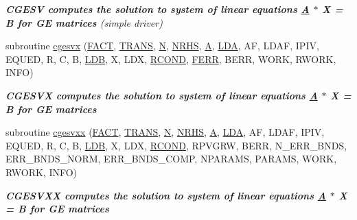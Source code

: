 \begin{DoxyCompactItemize}
\begin{DoxyCompactList}\small\item\em {\bfseries  C\+G\+E\+S\+V computes the solution to system of linear equations \hyperlink{classA}{A} $\ast$ X = B for G\+E matrices} (simple driver) \end{DoxyCompactList}\item 
subroutine \hyperlink{group__complexGEsolve_ga7ee0854ace0491ca1278df6d7a0eb28d}{cgesvx} (\hyperlink{superlu__enum__consts_8h_af00a42ecad444bbda75cde1b64bd7e72a1b6692b56d378abb85bd49063721d034}{F\+A\+C\+T}, \hyperlink{superlu__enum__consts_8h_a0c4e17b2d5cea33f9991ccc6a6678d62a1f61e3015bfe0f0c2c3fda4c5a0cdf58}{T\+R\+A\+N\+S}, \hyperlink{polmisc_8c_a0240ac851181b84ac374872dc5434ee4}{N}, \hyperlink{example__user_8c_aa0138da002ce2a90360df2f521eb3198}{N\+R\+H\+S}, \hyperlink{classA}{A}, \hyperlink{example__user_8c_ae946da542ce0db94dced19b2ecefd1aa}{L\+D\+A}, A\+F, L\+D\+A\+F, I\+P\+I\+V, E\+Q\+U\+E\+D, R, C, B, \hyperlink{example__user_8c_a50e90a7104df172b5a89a06c47fcca04}{L\+D\+B}, X, L\+D\+X, \hyperlink{superlu__enum__consts_8h_af00a42ecad444bbda75cde1b64bd7e72a9b5c151728d8512307565994c89919d5}{R\+C\+O\+N\+D}, \hyperlink{superlu__enum__consts_8h_af00a42ecad444bbda75cde1b64bd7e72a78fd14d7abebae04095cfbe02928f153}{F\+E\+R\+R}, B\+E\+R\+R, W\+O\+R\+K, R\+W\+O\+R\+K, I\+N\+F\+O)
\begin{DoxyCompactList}\small\item\em {\bfseries  C\+G\+E\+S\+V\+X computes the solution to system of linear equations \hyperlink{classA}{A} $\ast$ X = B for G\+E matrices} \end{DoxyCompactList}\item 
subroutine \hyperlink{group__complexGEsolve_ga54e141455b3d59923af0a5d79ffebcfb}{cgesvxx} (\hyperlink{superlu__enum__consts_8h_af00a42ecad444bbda75cde1b64bd7e72a1b6692b56d378abb85bd49063721d034}{F\+A\+C\+T}, \hyperlink{superlu__enum__consts_8h_a0c4e17b2d5cea33f9991ccc6a6678d62a1f61e3015bfe0f0c2c3fda4c5a0cdf58}{T\+R\+A\+N\+S}, \hyperlink{polmisc_8c_a0240ac851181b84ac374872dc5434ee4}{N}, \hyperlink{example__user_8c_aa0138da002ce2a90360df2f521eb3198}{N\+R\+H\+S}, \hyperlink{classA}{A}, \hyperlink{example__user_8c_ae946da542ce0db94dced19b2ecefd1aa}{L\+D\+A}, A\+F, L\+D\+A\+F, I\+P\+I\+V, E\+Q\+U\+E\+D, R, C, B, \hyperlink{example__user_8c_a50e90a7104df172b5a89a06c47fcca04}{L\+D\+B}, X, L\+D\+X, \hyperlink{superlu__enum__consts_8h_af00a42ecad444bbda75cde1b64bd7e72a9b5c151728d8512307565994c89919d5}{R\+C\+O\+N\+D}, R\+P\+V\+G\+R\+W, B\+E\+R\+R, N\+\_\+\+E\+R\+R\+\_\+\+B\+N\+D\+S, E\+R\+R\+\_\+\+B\+N\+D\+S\+\_\+\+N\+O\+R\+M, E\+R\+R\+\_\+\+B\+N\+D\+S\+\_\+\+C\+O\+M\+P, N\+P\+A\+R\+A\+M\+S, P\+A\+R\+A\+M\+S, W\+O\+R\+K, R\+W\+O\+R\+K, I\+N\+F\+O)
\begin{DoxyCompactList}\small\item\em {\bfseries  C\+G\+E\+S\+V\+X\+X computes the solution to system of linear equations \hyperlink{classA}{A} $\ast$ X = B for G\+E matrices} \end{DoxyCompactList}\end{DoxyCompactItemize}


